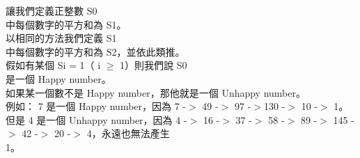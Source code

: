 讓我們定義正整數 S0\\
中每個數字的平方和為 S1。\\
以相同的方法我們定義 S1\\
中每個數字的平方和為 S2，並依此類推。\\
假如有某個 Si = 1（ i $\geq$ 1）則我們說 S0\\
是一個 Happy number。\\
如果某一個數不是 Happy number，那他就是一個 Unhappy number。\\
例如： 7 是一個 Happy number，因為 7 -$>$ 49 -$>$ 97 -$>$130 -$>$ 10 -$>$ 1。\\
但是 4 是一個 Unhappy number，因為 4 -$>$ 16 -$>$ 37 -$>$ 58 -$>$ 89 -$>$ 145 -$>$ 42 -$>$ 20 -$>$ 4，永遠也無法產生\\
 1。\\
